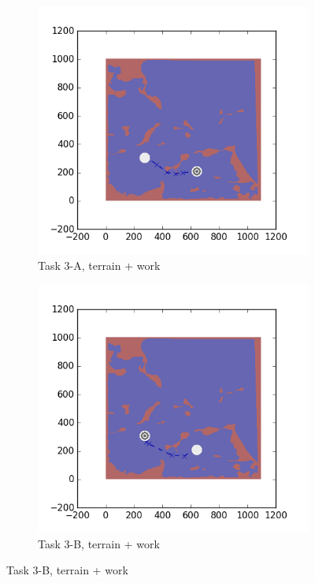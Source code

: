 \documentclass{tamuccthesis}
\begin{document}
\begin{figure}[H]
    \begin{subfigure}[b]{0.4\textwidth}
        \centering
        \includegraphics[width=\textwidth,trim={4cm 3cm 2cm 3cm},clip]{EXP3RG_PathCa_-1_-1_-1_0.png}
        \caption{ Task 3-A, terrain + work}
        \label{fig:Path_3-A_terrain_work}
    \end{subfigure}
    \hfill
    \begin{subfigure}[b]{0.4\textwidth}  
        \centering 
        \includegraphics[width=\textwidth,trim={4cm 3cm 2cm 3cm},clip]{EXP3RG_PathCb_-1_-1_-1_0.png}
        \caption{\small Task 3-B, terrain + work}
        \label{fig:Path_3-B_terrain_work}
    \end{subfigure}


\end{figure}
\end{document}
